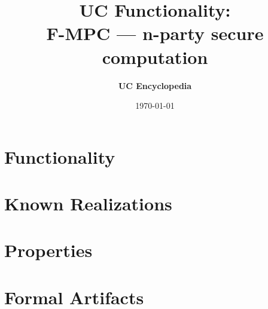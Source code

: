 \documentclass[11pt,a4paper]{article}
\title{\textbf{\Large UC Functionality:}\\[0.2em] \Large F-MPC --- n-party secure computation}
\author{\textbf{UC Encyclopedia}}
\date{\today}
\newtheorem{functionality}{Functionality}
\begin{document}
\maketitle

\begin{abstract}
\end{abstract}

\section{Functionality}

%

\section{Known Realizations}


\section{Properties}


\section{Formal Artifacts}

\end{document}
